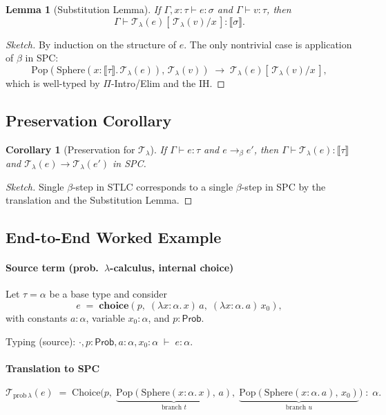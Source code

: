\documentclass{article}
\newtheorem{lemma}[theorem]{Lemma}
\newtheorem{corollary}[theorem]{Corollary}
\begin{document}
\begin{lemma}[Substitution Lemma]
If $\Gamma,x{:}\tau\vdash e:\sigma$ and $\Gamma\vdash v:\tau$, then
\[
\Gamma \vdash \mathcal{T}_\lambda(e)[\,\mathcal{T}_\lambda(v)/x\,] : \llbracket\sigma\rrbracket.
\]
\end{lemma}

\begin{proof}[Sketch]
By induction on the structure of $e$.
The only nontrivial case is application of $\beta$ in SPC:
\[
\mathrm{Pop}(\mathrm{Sphere}(x{:}\llbracket\tau\rrbracket.\,\mathcal{T}_\lambda(e)),\,\mathcal{T}_\lambda(v))
\;\to\;
\mathcal{T}_\lambda(e)[\,\mathcal{T}_\lambda(v)/x\,],
\]
which is well-typed by $\Pi$-Intro/Elim and the IH.
\end{proof}

\subsection{Preservation Corollary}

\begin{corollary}[Preservation for $\mathcal{T}_\lambda$]
If $\Gamma \vdash e:\tau$ and $e\to_\beta e'$, then
$\Gamma \vdash \mathcal{T}_\lambda(e) : \llbracket\tau\rrbracket$ and 
$\mathcal{T}_\lambda(e) \to \mathcal{T}_\lambda(e')$ in SPC.
\end{corollary}

\begin{proof}[Sketch]
Single $\beta$-step in STLC corresponds to a single $\beta$-step in SPC by the translation and the Substitution Lemma.
\end{proof}

\subsection{End-to-End Worked Example}

\paragraph{Source term (prob.\ $\lambda$-calculus, internal choice)}
Let $\tau=\alpha$ be a base type and consider
\[
e \;=\; \mathbf{choice}\!\left(p,\; (\lambda x{:}\alpha.\,x)\,a,\; (\lambda x{:}\alpha.\,a)\,x_0 \right),
\]
with constants $a:\alpha$, variable $x_0:\alpha$, and $p:\mathsf{Prob}$.

Typing (source): $\cdot,p:\mathsf{Prob},a:\alpha,x_0:\alpha \;\vdash\; e:\alpha$.

\paragraph{Translation to SPC}
\[
\mathcal{T}_{\mathrm{prob}\,\lambda}(e)
\;=\;
\mathrm{Choice}\!\Big(
p,\;
\underbrace{\mathrm{Pop}(\mathrm{Sphere}(x{:}\alpha.\,x),\,a)}_{\text{branch }t},\;
\underbrace{\mathrm{Pop}(\mathrm{Sphere}(x{:}\alpha.\,a),\,x_0)}_{\text{branch }u}
\Big)
\;:\; \alpha.
\]
\end{document}
